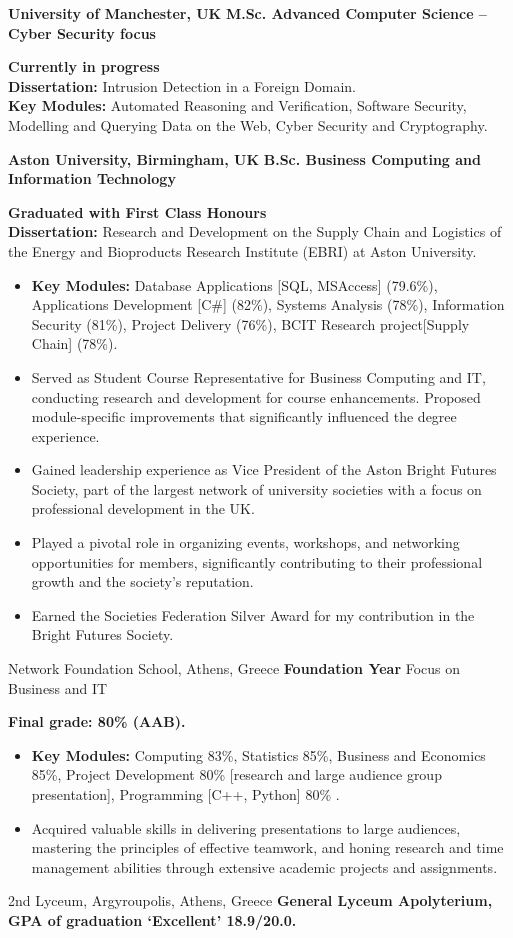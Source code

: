 {\textbf{University of Manchester, UK}}
{\textbf{M.Sc. Advanced Computer Science -- Cyber Security focus}}
{
    \textbf{Currently in progress}
    \\\textbf{Dissertation:} Intrusion Detection in a Foreign Domain.
    \\\textbf{Key Modules:} Automated Reasoning and Verification, Software Security, Modelling and Querying Data on the Web, Cyber Security and Cryptography.

}

{\textbf{Aston University, Birmingham, UK}}
{\textbf{B.Sc. Business Computing and Information Technology}}
{
    \textbf{Graduated with First Class Honours }
    \\
    \textbf{Dissertation:} Research and Development on the Supply Chain and Logistics of the Energy and Bioproducts Research Institute (EBRI) at Aston University.
    \begin{itemize}
        \item \textbf{Key Modules:} Database Applications [SQL, MSAccess] (79.6\%), Applications Development [C\#] (82\%), Systems Analysis (78\%), Information Security (81\%), Project Delivery (76\%), BCIT Research project[Supply Chain]  (78\%).
        \item Served as Student Course Representative for Business Computing and IT, conducting research and
              development for course enhancements. Proposed module-specific improvements that significantly
              influenced the degree experience.
        \item Gained leadership experience as Vice President of the Aston Bright Futures Society, part of the largest network of university societies with a focus on professional development in the UK.
        \item Played a pivotal role in organizing events, workshops, and networking opportunities for members, significantly contributing to their professional growth and the society's reputation.
        \item Earned the Societies Federation Silver Award for my contribution in the Bright Futures Society.
    \end{itemize}
}

{Network Foundation School, Athens, Greece}
{\textbf{Foundation Year} Focus on Business and IT}
{
    \textbf{Final grade: 80\% (AAB).}
    \begin{itemize}
        \item \textbf{Key Modules:} Computing 83\%, Statistics 85\%, Business and Economics 85\%, Project Development 80\% [research and large audience group presentation], Programming [C++, Python] 80\% .
        \item Acquired valuable skills in delivering presentations to large audiences, mastering the principles of effective teamwork, and honing research and time management abilities through extensive academic projects and assignments.
    \end{itemize}
}

{}
{2nd Lyceum, Argyroupolis, Athens, Greece}
{\textbf{General Lyceum Apolyterium, GPA of graduation ‘Excellent’ 18.9/20.0.}}
